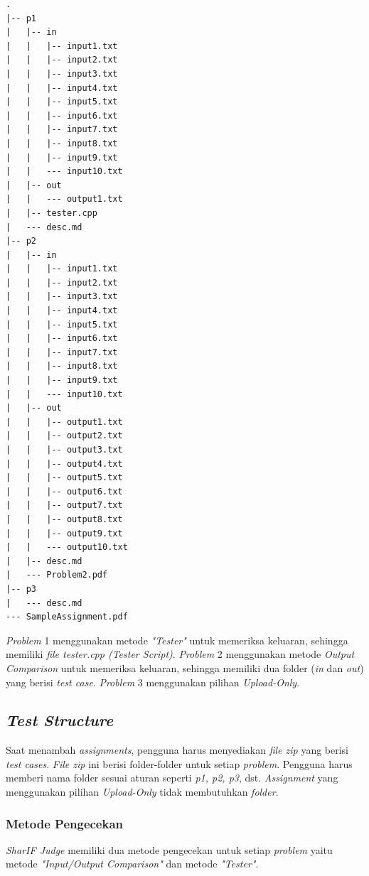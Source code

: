 \documentclass[a4paper,twoside]{article}
\begin{document}
\begin{enumerate}
		\begin{lstlisting}[basicstyle=\ttfamily, frame=single,
		columns=fullflexible, keepspaces=true, breaklines=true, label=ls:8]
.
|-- p1
|   |-- in
|   |   |-- input1.txt
|   |   |-- input2.txt
|   |   |-- input3.txt
|   |   |-- input4.txt
|   |   |-- input5.txt
|   |   |-- input6.txt
|   |   |-- input7.txt
|   |   |-- input8.txt
|   |   |-- input9.txt
|   |   --- input10.txt
|   |-- out
|   |   --- output1.txt
|   |-- tester.cpp
|   --- desc.md
|-- p2
|   |-- in
|   |   |-- input1.txt
|   |   |-- input2.txt
|   |   |-- input3.txt
|   |   |-- input4.txt
|   |   |-- input5.txt
|   |   |-- input6.txt
|   |   |-- input7.txt
|   |   |-- input8.txt
|   |   |-- input9.txt
|   |   --- input10.txt
|   |-- out
|   |   |-- output1.txt
|   |   |-- output2.txt
|   |   |-- output3.txt
|   |   |-- output4.txt
|   |   |-- output5.txt
|   |   |-- output6.txt
|   |   |-- output7.txt
|   |   |-- output8.txt
|   |   |-- output9.txt
|   |   --- output10.txt
|   |-- desc.md
|   --- Problem2.pdf
|-- p3
|   --- desc.md
--- SampleAssignment.pdf
		\end{lstlisting}
		
		\textit{Problem} 1 menggunakan metode \textit{"Tester"} untuk memeriksa keluaran, sehingga memiliki \textit{file tester.cpp (Tester Script)}. \textit{Problem} 2 menggunakan metode \textit{Output Comparison} untuk memeriksa keluaran, sehingga memiliki dua folder (\textit{in} dan \textit{out}) yang berisi \textit{test case}. \textit{Problem} 3 menggunakan pilihan \textit{Upload-Only}.
		
		\subsection*{\textit{Test Structure}}
		\label{subsec:test_structure}
		Saat menambah \textit{assignments}, pengguna harus menyediakan \textit{file zip} yang berisi \textit{test cases}. \textit{File zip} ini berisi folder-folder untuk setiap \textit{problem}. Pengguna harus memberi nama folder sesuai aturan seperti \textit{p1, p2, p3}, dst. \textit{Assignment} yang menggunakan pilihan \textit{Upload-Only} tidak membutuhkan \textit{folder}.
		
		\subsubsection*{Metode Pengecekan}
		\label{subsubsec:metode_pengecekan}
		\textit{SharIF Judge} memiliki dua metode pengecekan untuk setiap \textit{problem} yaitu metode \textit{"Input/Output Comparison"} dan metode \textit{"Tester"}.
		

\end{enumerate}
\end{document}
